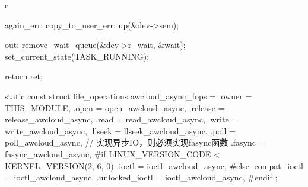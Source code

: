 \begin{code-block}{c}
{again_err:
copy_to_user_err:
        up(&dev->sem);

out:                                                                                                                   remove_wait_queue(&dev->r_wait, &wait);
        set_current_state(TASK_RUNNING);

        return ret;
}

static const struct file_operations awcloud_async_fops = {
        .owner          = THIS_MODULE,
        .open           = open_awcloud_async,                                                                          .release        = release_awcloud_async,
        .read           = read_awcloud_async,
        .write          = write_awcloud_async,
        .llseek         = llseek_awcloud_async,
        .poll           = poll_awcloud_async,
        // 实现异步IO，则必须实现fasync函数
        .fasync         = fasync_awcloud_async,
#if LINUX_VERSION_CODE < KERNEL_VERSION(2, 6, 0)
        .ioctl          = ioctl_awcloud_async,
#else
        .compat_ioctl   = ioctl_awcloud_async,
        .unlocked_ioctl = ioctl_awcloud_async,
#endif
};
\end{code-block}
